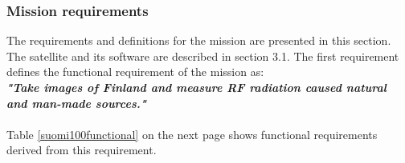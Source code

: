 \documentclass[english,12pt,a4paper,pdftex,elec,utf8]{aaltothesis}
\begin{document}
\subsubsection{Mission requirements} 
The requirements and definitions for the mission are presented in this section. The satellite and its software are described in section 3.1. The first requirement defines the functional requirement of the mission as: 
\\
\textbf{\textit{"Take images of Finland and measure RF radiation caused natural and man-made sources."}}
\\
\\
Table \ref{suomi100functional} on the next page shows functional requirements derived from this requirement.
\end{document}
